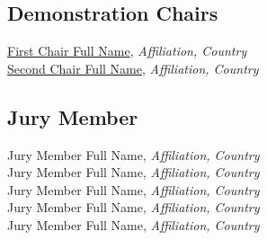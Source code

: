 
\subsection{Demonstration Chairs}
\href{https://orcid.org/0000-0001-2345-6789}{First Chair Full Name}, \emph{Affiliation, Country}\\
\href{https://orcid.org/0000-0001-2345-6789}{Second Chair Full Name}, \emph{Affiliation, Country}\\


\subsection{Jury Member}
Jury Member Full Name, \emph{Affiliation, Country}\\
Jury Member Full Name, \emph{Affiliation, Country}\\
Jury Member Full Name, \emph{Affiliation, Country}\\
Jury Member Full Name, \emph{Affiliation, Country}\\
Jury Member Full Name, \emph{Affiliation, Country}\\
